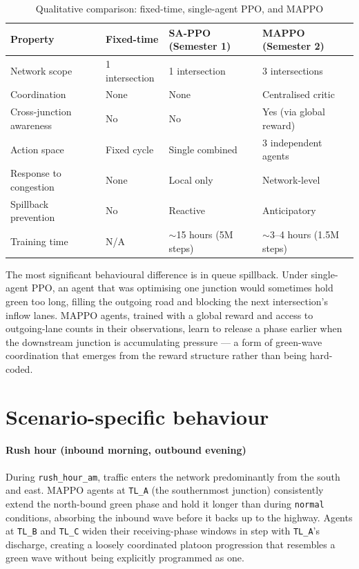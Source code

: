 \documentclass[11pt, a4paper]{report}
\begin{document}
\begin{table}[H]
\centering
\caption{Qualitative comparison: fixed-time, single-agent PPO, and MAPPO}
\label{tab:mappo_vs_ppo}
\begin{tabular}{p{3.2cm}p{3.5cm}p{3.5cm}p{3.5cm}}
\toprule
\textbf{Property} & \textbf{Fixed-time} & \textbf{SA-PPO (Semester 1)} & \textbf{MAPPO (Semester 2)} \\
\midrule
Network scope & 1 intersection & 1 intersection & 3 intersections \\
Coordination & None & None & Centralised critic \\
Cross-junction awareness & No & No & Yes (via global reward) \\
Action space & Fixed cycle & Single combined & 3 independent agents \\
Response to congestion & None & Local only & Network-level \\
Spillback prevention & No & Reactive & Anticipatory \\
Training time & N/A & $\sim$15 hours (5M steps) & $\sim$3--4 hours (1.5M steps) \\
\bottomrule
\end{tabular}
\end{table}

The most significant behavioural difference is in queue spillback. Under single-agent PPO, an agent that was optimising one junction would sometimes hold green too long, filling the outgoing road and blocking the next intersection's inflow lanes. MAPPO agents, trained with a global reward and access to outgoing-lane counts in their observations, learn to release a phase earlier when the downstream junction is accumulating pressure --- a form of green-wave coordination that emerges from the reward structure rather than being hard-coded.

\section{Scenario-specific behaviour}

\paragraph{Rush hour (inbound morning, outbound evening)}

During \texttt{rush\_hour\_am}, traffic enters the network predominantly from the south and east. MAPPO agents at \texttt{TL\_A} (the southernmost junction) consistently extend the north-bound green phase and hold it longer than during \texttt{normal} conditions, absorbing the inbound wave before it backs up to the highway. Agents at \texttt{TL\_B} and \texttt{TL\_C} widen their receiving-phase windows in step with \texttt{TL\_A}'s discharge, creating a loosely coordinated platoon progression that resembles a green wave without being explicitly programmed as one.
\end{document}
